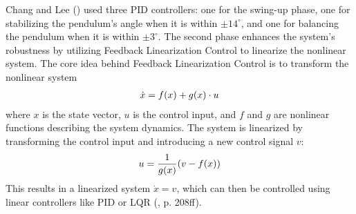 Chang and Lee (\citeyear{chang_design_2007}) used three PID controllers: one for the swing-up phase, one for stabilizing the pendulum's angle when it is within $\pm 14^\circ$, and one for balancing the pendulum when it is within $\pm 3^\circ$. The second phase enhances the system's robustness by utilizing Feedback Linearization Control to linearize the nonlinear system. The core idea behind Feedback Linearization Control is to transform the nonlinear system
\begin{align}
    \dot{x} = f(x) + g(x)\cdot u \notag
\end{align}
where $x$ is the state vector, $u$ is the control input, and $f$ and $g$ are nonlinear functions describing the system dynamics. The system is linearized by transforming the control input and introducing a new control signal $v$:
\begin{align}
    u = \frac{1}{g(x)}(v - f(x)) \notag
\end{align}
This results in a linearized system $\dot{x} = v$, which can then be controlled using linear controllers like PID or LQR (\cite{slotine_applied_1991}, p. 208ff).


